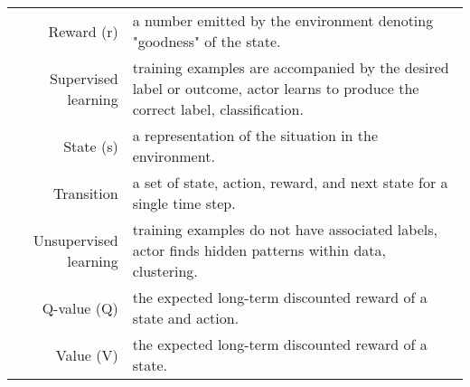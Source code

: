 \begin{longtable}{@{}rY@{}}
		Reward (r) & a number emitted by the environment denoting "goodness" of the state. \\
		Supervised learning & training examples are accompanied by the desired label or outcome, actor learns to produce the correct label, classification. \\
		State (s) & a representation of the situation in the environment. \\
		Transition & a set of state, action, reward, and next state for a single time step. \\
		Unsupervised learning & training examples do not have associated labels, actor finds hidden patterns within data, clustering.  \\
		Q-value (Q) & the expected long-term discounted reward of a state and action. \\
		Value (V) & the expected long-term discounted reward of a state. \\
		\bottomrule 
	\end{longtable} 
